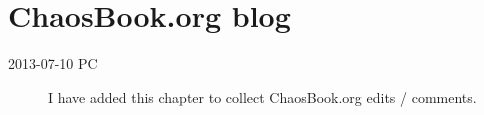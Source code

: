 
\chapter{ChaosBook.org blog}
\label{chap:LyapChaosBook}

\renewcommand{\ssp}{x}

\begin{description}

\item[2013-07-10 PC]
I have added this chapter to collect ChaosBook.org edits /
comments.

\end{description}

%


%
%



